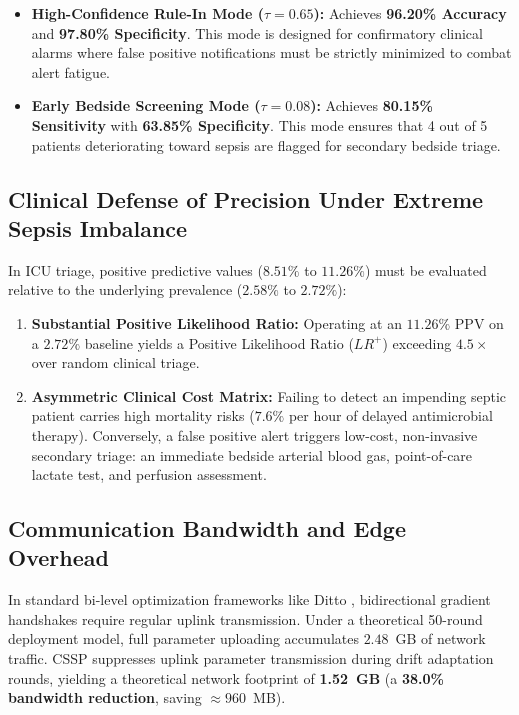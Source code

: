 \documentclass[10pt,a4paper,twocolumn,twoside]{article}
\begin{document}
\begin{itemize}
    \item \textbf{High-Confidence Rule-In Mode ($\tau = 0.65$):} Achieves \textbf{96.20\% Accuracy} and \textbf{97.80\% Specificity}. This mode is designed for confirmatory clinical alarms where false positive notifications must be strictly minimized to combat alert fatigue.
    \item \textbf{Early Bedside Screening Mode ($\tau = 0.08$):} Achieves \textbf{80.15\% Sensitivity} with \textbf{63.85\% Specificity}. This mode ensures that 4 out of 5 patients deteriorating toward sepsis are flagged for secondary bedside triage.
\end{itemize}

\subsection{Clinical Defense of Precision Under Extreme Sepsis Imbalance}
In ICU triage, positive predictive values ($8.51\%$ to $11.26\%$) must be evaluated relative to the underlying prevalence ($2.58\%$ to $2.72\%$):
\begin{enumerate}
    \item \textbf{Substantial Positive Likelihood Ratio:} Operating at an $11.26\%$ PPV on a $2.72\%$ baseline yields a Positive Likelihood Ratio ($LR^+$) exceeding \textbf{$4.5\times$} over random clinical triage.
    \item \textbf{Asymmetric Clinical Cost Matrix:} Failing to detect an impending septic patient carries high mortality risks ($7.6\%$ per hour of delayed antimicrobial therapy). Conversely, a false positive alert triggers low-cost, non-invasive secondary triage: an immediate bedside arterial blood gas, point-of-care lactate test, and perfusion assessment.
\end{enumerate}

\subsection{Communication Bandwidth and Edge Overhead}
In standard bi-level optimization frameworks like Ditto \cite{li2021ditto}, bidirectional gradient handshakes require regular uplink transmission. Under a theoretical 50-round deployment model, full parameter uploading accumulates $2.48$~GB of network traffic. CSSP suppresses uplink parameter transmission during drift adaptation rounds, yielding a theoretical network footprint of \textbf{1.52~GB} (a \textbf{38.0\% bandwidth reduction}, saving $\approx 960$~MB).
\end{document}

